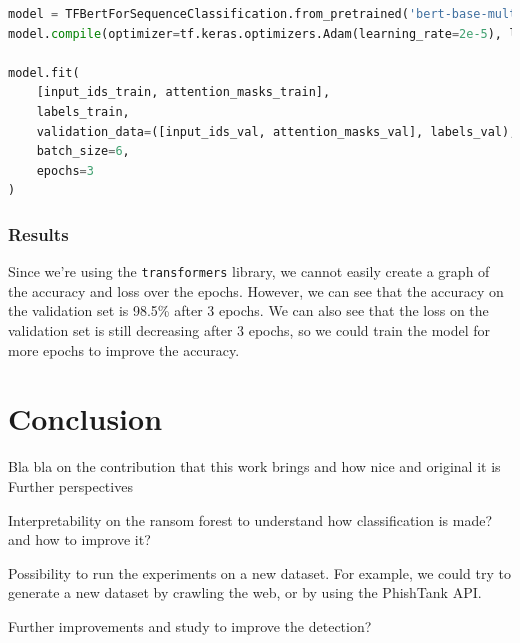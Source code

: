 \documentclass{article}
\begin{document}
    \begin{lstlisting}[language=Python, caption=Fine tuning Bert]
model = TFBertForSequenceClassification.from_pretrained('bert-base-multilingual-uncased')
model.compile(optimizer=tf.keras.optimizers.Adam(learning_rate=2e-5), loss=tf.keras.losses.SparseCategoricalCrossentropy(from_logits=True), metrics="accuracy")

model.fit(
    [input_ids_train, attention_masks_train],
    labels_train,
    validation_data=([input_ids_val, attention_masks_val], labels_val),
    batch_size=6,
    epochs=3
)
    \end{lstlisting}

    \subsubsection{Results}

    Since we're using the \texttt{transformers} library, we cannot easily create a graph of the accuracy and loss over the epochs. However, we can see that the accuracy on the validation set is 98.5\% after 3 epochs. We can also see that the loss on the validation set is still decreasing after 3 epochs, so we could train the model for more epochs to improve the accuracy.


    \section{Conclusion}\label{sec:conclusion}

    Bla bla on the contribution that this work brings and how nice and original it is
    Further perspectives

    Interpretability on the ransom forest to understand how classification is made? and how to improve it?

    Possibility to run the experiments on a new dataset.
    For example, we could try to generate a new dataset by crawling the web, or by using the PhishTank API.

    Further improvements and study to improve the detection?
\end{document}
